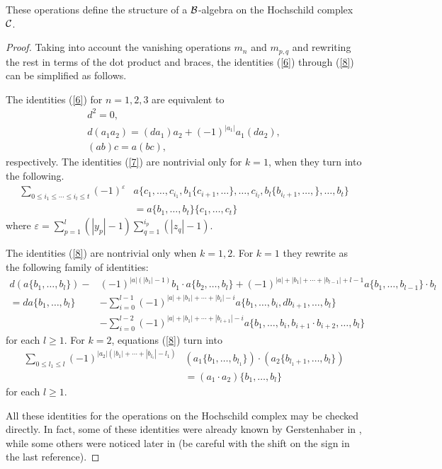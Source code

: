 \documentclass[TFM.tex]{subfiles}
\begin{document}
\begin{thm}
These operations define the structure of a $\mathcal{B}$-algebra on the Hochschild complex $\mathcal{C}$.
\end{thm}
\begin{proof}
Taking into account the vanishing operations $m_n$ and $m_{p,q}$ and rewriting
the rest in terms of the dot product and braces, the identities (\ref{6}) through (\ref{8}) can
be simplified as follows.

The identities (\ref{6}) for $n=1,2,3$ are equivalent to
\begin{gather*}
d^2=0,\\
d(a_1a_2)=(da_1)a_2+(-1)^{|a_1|}a_1(da_2),\\
(ab)c=a(bc),
\end{gather*}
respectively. The identities (\ref{7}) are nontrivial only for $k = 1$, when they turn into the following.
\begin{align*}
\sum_{0\leq i_1\leq\cdots\leq i_l\leq t}(-1)^{\varepsilon}&a\{c_1,\dots, c_{i_1},b_1\{c_{i+1},\dots\},\dots,c_{i_l},b_l\{b_{i_l+1},\dots,\},\dots,b_t\}\\
&=a\{b_1,\dots, b_t\}\{c_1,\dots, c_t\}
\end{align*}
where $\varepsilon=\sum_{p=1}^l(|y_p|-1)\sum_{q=1}^{i_p}(|z_q|-1)$.

The identities (\ref{8}) are nontrivial only when $k = 1,2$. For $k = 1$ they rewrite
as the following family of identities:
\begin{equation}\label{9}
\begin{aligned}
d(a\{b_1,\dots, b_l\})-&(-1)^{|a|(|b_1|-1)}b_1\cdot a\{b_2,\dots,b_l\}+(-1)^{|a|+|b_1|+\cdots+|b_{l-1}|+l-1}a\{b_1,\dots, b_{l-1}\}\cdot b_l\\
=da\{b_1,\dots, b_l\}&-\sum_{i=0}^{l-1}(-1)^{|a|+|b_1|+\cdots+|b_i|-i}a\{b_1,\dots, b_i,db_{i+1},\dots,b_l\}\\
&-\sum_{i=0}^{l-2}(-1)^{|a|+|b_1|+\cdots+|b_{i+1}|-i}a\{b_1,\dots, b_i,b_{i+1}\cdot b_{i+2},\dots,b_l\}
\end{aligned}
\end{equation}
for each $l ≥ 1$. For $k = 2$, equations (\ref{8}) turn into
\begin{equation}
\begin{aligned}
\sum_{0\leq l_1\leq l}(-1)^{|a_2|(|b_1|+\cdots+|b_{l_1}|-l_1)}&(a_1\{b_1,\dots, b_{l_1}\})\cdot(a_2\{b_{l_1+1},\dots, b_l\})\\
&=(a_1\cdot a_2)\{b_1,\dots, b_l\}
\end{aligned}
\end{equation}
for each $l ≥ 1$.

All these identities for the operations on the Hochschild complex may be checked
directly. In fact, some of these identities were already known by Gerstenhaber in \cite{Gerstenhaber}, while some others were noticed later in \cite{higher} (be careful with the shift on the sign in the last reference).
\end{proof}
\end{document}
